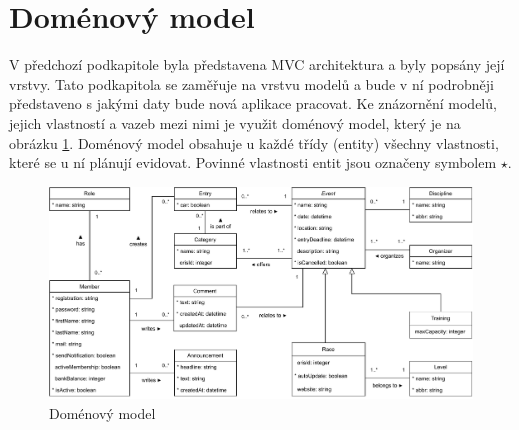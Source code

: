 \section{Doménový model}
V předchozí podkapitole byla představena MVC architektura a byly popsány její vrstvy. Tato podkapitola se zaměřuje na vrstvu modelů a bude v ní podrobněji představeno s jakými daty bude nová aplikace pracovat. Ke znázornění modelů, jejich vlastností a vazeb mezi nimi je využit doménový model, který je na obrázku \ref{figure:domain-model}. Doménový model obsahuje u každé třídy (entity) všechny vlastnosti, které se u ní plánují evidovat. Povinné vlastnosti entit jsou označeny symbolem $ \star $.

\begin{landscape}
	\hspace{0pt}
	\vfil
	\begin{figure}[h]
		\caption{Doménový model}
		\label{figure:domain-model}
		\centering
		\includegraphics[width=0.9\linewidth]{images/domain-model.pdf}
	\end{figure}
	\vfil
	\hspace{0pt}
\end{landscape}
